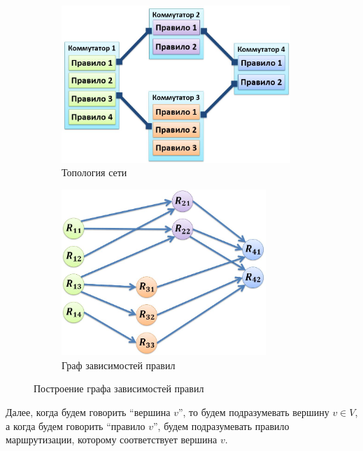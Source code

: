 \documentclass[../thesis.tex]{subfiles}
\begin{document}
\begin{figure}
\centering
\begin{subfigure}[b]{0.45\textwidth}
  \centering
  \includegraphics[width=0.95\textwidth]{figures/switchrules.jpg}
  \caption{Топология сети} \label{fig:switchrules}
\end{subfigure}
\begin{subfigure}[b]{0.45\textwidth}
  \centering
  \includegraphics[width=0.85\textwidth]{figures/dependencygraph.jpg}
  \caption{Граф зависимостей правил} \label{fig:dependencygraph}
\end{subfigure}
\caption{Построение графа зависимостей правил}
\end{figure}

Далее, когда будем говорить “вершина $v$”, то будем подразумевать вершину $v\in V$, а когда будем говорить “правило $v$”, будем подразумевать правило маршрутизации, которому соответствует вершина $v$.
\end{document}
